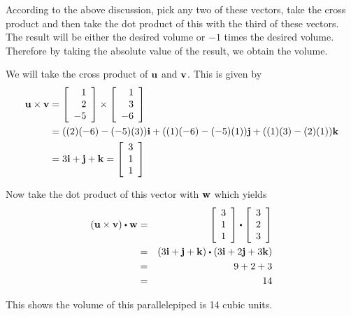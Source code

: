 \begin{solution}
According to the above discussion, pick any two of these vectors, take the cross
product and then take the dot product of this with the third of these
vectors. The result will be either the desired volume or $-1$ times the desired
volume. Therefore by taking the absolute value of the result, we obtain the volume. 

We will take the cross product of ${\bf u}$ and ${\bf v}$. 
This is given by 
\begin{align*}
{\bf u} \times {\bf v}
&=
\left[
\begin{array}{r}
1 \\
2 \\
-5
\end{array}
\right]
\times
\left[
\begin{array}{r}
1 \\
3 \\
-6
\end{array}
\right]\\
&=((2)(-6)-(-5)(3)){\bf i}+((1)(-6)-(-5)(1)){\bf j}+((1)(3)-(2)(1)){\bf k} \\
&= 3{\bf i}+{\bf j}+{\bf k}
=
\left[
\begin{array}{r}
3 \\
1 \\
1
\end{array}
\right] 
\end{align*}

Now take the dot product of this vector with ${\bf w}$ which yields
\begin{eqnarray*}
(\vect{u} \times \vect{v}) \dotprod \vect{w}
&=&
\leftB
\begin{array}{r}
3 \\
1 \\
1
\end{array}
\rightB
\dotprod
\leftB
\begin{array}{r}
3 \\
2 \\
3 
\end{array}
\rightB \\
&=&\left( 3\vect{i}+\vect{j}+\vect{k}\right) \dotprod
 \left( 3\vect{i}+2\vect{j}+3\vect{k}\right) \\
&=&9+2+3 \\
&=&14
\end{eqnarray*}

This shows the volume of this parallelepiped is 14 cubic units.
\end{solution}

